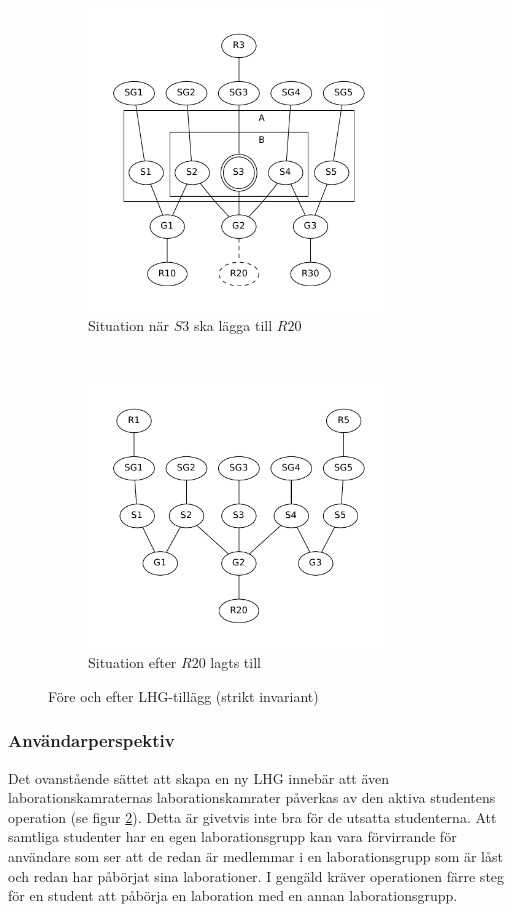 \begin{figure}
  \centering
  \begin{subfigure}[b]{0.5\textwidth}
    \centering
    \includegraphics[width=8.0cm]{fig/labgroup/strict_proof.pdf}
    \caption{Situation när $S3$ ska lägga till $R20$}
    \label{fig:strict-proof}
  \end{subfigure}%
        ~ %
  \begin{subfigure}[b]{0.5\textwidth}
    \centering
    \includegraphics[width=8.0cm]{fig/labgroup/strict_proof_continue.pdf}
    \caption{Situation efter $R20$ lagts till}
    \label{fig:strict-proof-continue}
  \end{subfigure}
  \caption{Före och efter LHG-tillägg (strikt invariant)}\label{fig:animals}
\end{figure}

\subsubsection{Användarperspektiv}
Det ovanstående sättet att skapa en ny LHG innebär att även laborationskamraternas laborationskamrater påverkas av den aktiva studentens operation (se figur \ref{fig:strict-proof-continue}). Detta är givetvis inte bra för de utsatta studenterna. Att samtliga studenter har en egen laborationsgrupp kan vara förvirrande för användare som ser att de redan är medlemmar i en laborationsgrupp som är låst och redan har påbörjat sina laborationer. I gengäld kräver operationen färre steg för en student att påbörja en laboration med en annan laborationsgrupp.

